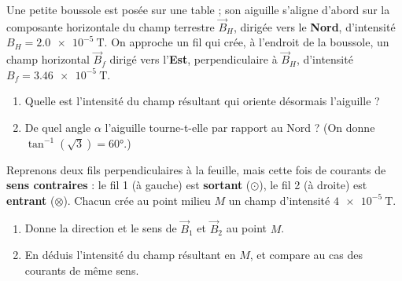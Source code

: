 \documentclass[11pt,a4paper]{article}
\newcommand{\vv}[1]{\vec{#1}}\newcommand{\ds}{\displaystyle}
\begin{document}
\begin{exo}
Une petite boussole est posée sur une table ; son aiguille s'aligne d'abord sur la composante
horizontale du champ terrestre $\vv{B}_H$, dirigée vers le \textbf{Nord}, d'intensité
$B_H=\qty{2.0e-5}{\tesla}$. On approche un fil qui crée, à l'endroit de la boussole, un champ
horizontal $\vv{B}_f$ dirigé vers l'\textbf{Est}, perpendiculaire à $\vv{B}_H$, d'intensité
$B_f=\qty{3.46e-5}{\tesla}$.
\begin{center}
\end{center}
\begin{enumerate}[label=\alph*)]
  \item Quelle est l'intensité du champ résultant qui oriente désormais l'aiguille ?
  \item De quel angle $\alpha$ l'aiguille tourne-t-elle par rapport au Nord ? (On donne
        $\tan^{-1}(\sqrt{3})=\ang{60}$.)
\end{enumerate}
\end{exo}

\begin{exo}
Reprenons deux fils perpendiculaires à la feuille, mais cette fois de courants de \textbf{sens
contraires} : le fil 1 (à gauche) est \textbf{sortant} ($\odot$), le fil 2 (à droite) est
\textbf{entrant} ($\otimes$). Chacun crée au point milieu $M$ un champ d'intensité
$\qty{4e-5}{\tesla}$.
\begin{center}
\end{center}
\begin{enumerate}[label=\alph*)]
  \item Donne la direction et le sens de $\vv{B}_1$ et $\vv{B}_2$ au point $M$.
  \item En déduis l'intensité du champ résultant en $M$, et compare au cas des courants de même sens.
\end{enumerate}
\end{exo}
\end{document}
